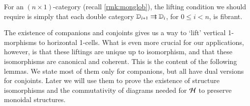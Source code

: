\documentclass{amsart}
\begin{document}
\begin{rmk}
  For an $(n\times 1)$-category (recall \autoref{rmk:monglob}), the
  lifting condition we should require is simply that each double
  category $\mathbb{D}_{i+1} \rightrightarrows \mathbb{D}_i$, for $0\le i < n$, is fibrant.
\end{rmk}

The existence of companions and conjoints gives us a way to `lift'
vertical 1-morphisms to horizontal 1-cells.  What is even more crucial
for our applications, however, is that these liftings are unique up to
isomorphism, and that these isomorphisms are canonical and coherent.
This is the content of the following lemmas.  We state most of them
only for companions, but all have dual versions for conjoints. Later we will use them to prove the existence of structure isomorphisms and the commutativity of diagrams needed for $\mathcal{H}$ to preserve monoidal structures.
\end{document}
